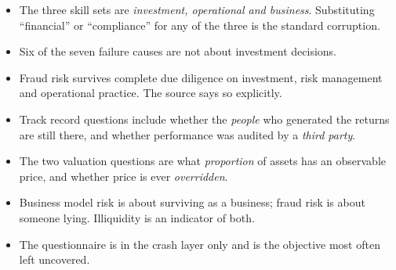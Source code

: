 \begin{imtrapbox}[title={Consolidated trap summary --- IM-12}]
\begin{itemize}
\item {} The three skill sets are \emph{investment, operational and
business}. Substituting ``financial'' or ``compliance'' for any of the three is
the standard corruption.
\item {} Six of the seven failure causes are not about
investment decisions.
\item {} Fraud risk survives complete due diligence on
investment, risk management and operational practice. The source says so
explicitly.
\item {} Track record questions include whether the
\emph{people} who generated the returns are still there, and whether performance
was audited by a \emph{third party}.
\item {} The two valuation questions are what
\emph{proportion} of assets has an observable price, and whether price is ever
\emph{overridden}.
\item {} Business model risk is about surviving as a
business; fraud risk is about someone lying. Illiquidity is an indicator of both.
\item {} The questionnaire is in the crash layer only and is
the objective most often left uncovered.
\end{itemize}
\end{imtrapbox}

